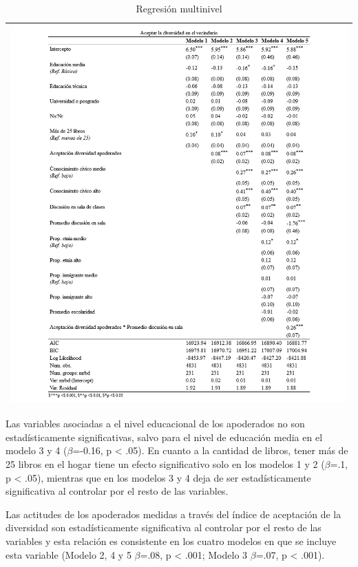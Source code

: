 \documentclass[12pt,twoside]{templates/facsothesis}
\begin{document}
\begin{longtable}[]{@{}l@{}}
\caption{\label{tab:multinivel}Regresión multinivel}\tabularnewline
\toprule()
\endhead
\includegraphics{IPO/output/tables/reg.png} \\
\bottomrule()
\end{longtable}

Las variables asociadas a el nivel educacional de los apoderados no son estadísticamente significativas, salvo para el nivel de educación media en el modelo 3 y 4 (\(\beta\)=-0.16, p \textless{} .05). En cuanto a la cantidad de libros, tener más de 25 libros en el hogar tiene un efecto significativo solo en los modelos 1 y 2 (\(\beta\)=.1, p \textless{} .05), mientras que en los modelos 3 y 4 deja de ser estadísticamente significativa al controlar por el resto de las variables.

Las actitudes de los apoderados medidas a través del índice de aceptación de la diversidad son estadísticamente significativa al controlar por el resto de las variables y esta relación es consistente en los cuatro modelos en que se incluye esta variable (Modelo 2, 4 y 5 \(\beta\)=.08, p \textless{} .001; Modelo 3 \(\beta\)=.07, p \textless{} .001).
\end{document}
